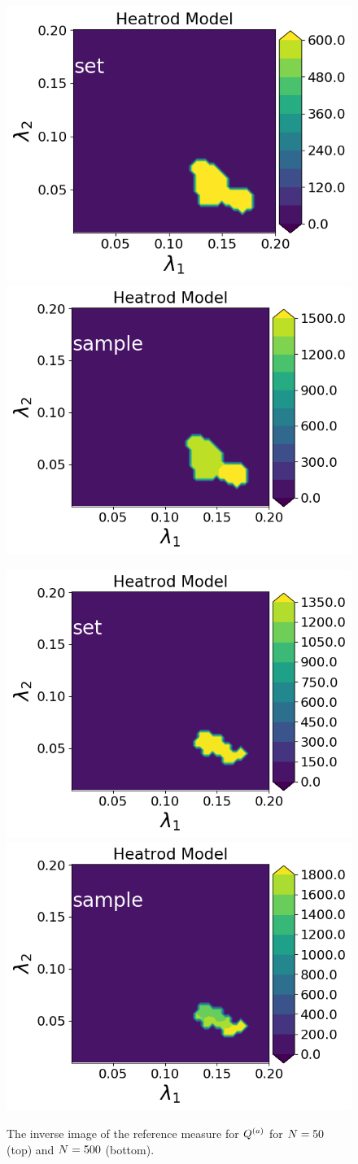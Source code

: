 \begin{figure}
\includegraphics[width=.45\linewidth]{examples/fig_heatrod_q1/HeatrodModel--set_N50_em.png}
\includegraphics[width=.45\linewidth]{examples/fig_heatrod_q1/HeatrodModel--sample_N50_mc.png}

\includegraphics[width=.45\linewidth]{examples/fig_heatrod_q1/HeatrodModel--set_N500_em.png}
\includegraphics[width=.45\linewidth]{examples/fig_heatrod_q1/HeatrodModel--sample_N500_mc.png}

\caption{The inverse image of the reference measure for $Q^{(a)}$ for $N = 50$ (top) and $N = 500$ (bottom). }
\label{fig:heatrod-convergence-a}
\end{figure}

